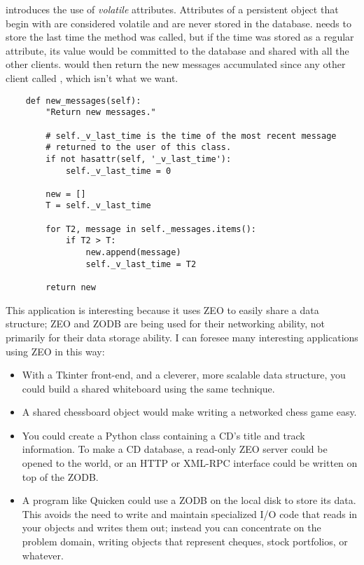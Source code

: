  introduces the use of \textit{volatile}
attributes.  Attributes of a persistent object that begin with
 are considered volatile and are never stored in the
database.   needs to store the last time
the method was called, but if the time was stored as a regular
attribute, its value would be committed to the database and shared
with all the other clients.   would then
return the new messages accumulated since any other client called
, which isn't what we want.

\begin{verbatim}
    def new_messages(self):
        "Return new messages."

        # self._v_last_time is the time of the most recent message
        # returned to the user of this class. 
        if not hasattr(self, '_v_last_time'):
            self._v_last_time = 0

        new = []
        T = self._v_last_time

        for T2, message in self._messages.items():
            if T2 > T:
                new.append(message)
                self._v_last_time = T2

        return new
\end{verbatim}

This application is interesting because it uses ZEO to easily share a
data structure; ZEO and ZODB are being used for their networking
ability, not primarily for their data storage ability.  I can foresee
many interesting applications using ZEO in this way:

\begin{itemize}
  \item With a Tkinter front-end, and a cleverer, more scalable data
  structure, you could build a shared whiteboard using the same
  technique.

  \item A shared chessboard object would make writing a networked chess
  game easy.  

  \item You could create a Python class containing a CD's title and
  track information.  To make a CD database, a read-only ZEO server
  could be opened to the world, or an HTTP or XML-RPC interface could
  be written on top of the ZODB.

  \item A program like Quicken could use a ZODB on the local disk to
  store its data.  This avoids the need to write and maintain
  specialized I/O code that reads in your objects and writes them out;
  instead you can concentrate on the problem domain, writing objects
  that represent cheques, stock portfolios, or whatever.

\end{itemize}

